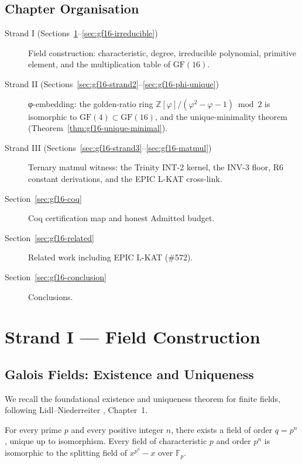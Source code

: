\subsection{Chapter Organisation}

\begin{description}
  \item[Strand I (Sections~\ref{sec:gf16-strand1}–\ref{sec:gf16-irreducible})]
    Field construction: characteristic, degree, irreducible polynomial,
    primitive element, and the multiplication table of \(\mathrm{GF}(16)\).
  \item[Strand II (Sections~\ref{sec:gf16-strand2}–\ref{sec:gf16-phi-unique})]
    φ-embedding: the golden-ratio ring
    \(\mathbb{Z}[\varphi]/(\varphi^{2}-\varphi-1)\bmod 2\)
    is isomorphic to \(\mathrm{GF}(4)\subset\mathrm{GF}(16)\),
    and the unique-minimality theorem (Theorem~\ref{thm:gf16-unique-minimal}).
  \item[Strand III (Sections~\ref{sec:gf16-strand3}–\ref{sec:gf16-matmul})]
    Ternary matmul witness: the Trinity INT-2 kernel, the INV-3 floor,
    R6 constant derivations, and the EPIC L-KAT cross-link.
  \item[Section~\ref{sec:gf16-coq}]
    Coq certification map and honest Admitted budget.
  \item[Section~\ref{sec:gf16-related}]
    Related work including EPIC L-KAT (\#572).
  \item[Section~\ref{sec:gf16-conclusion}]
    Conclusions.
\end{description}

\section{Strand I — Field Construction}
\label{sec:gf16-strand1}

\subsection{Galois Fields: Existence and Uniqueness}
\label{sec:gf16-exist}

We recall the foundational existence and uniqueness theorem for finite fields,
following Lidl–Niederreiter \cite{lidl_finite_fields}, Chapter~1.

\begin{theorem}
\label{thm:gf-exist-unique}
For every prime \(p\) and every positive integer \(n\), there exists
a field of order \(q = p^{n}\), unique up to isomorphism.
Every field of characteristic \(p\) and order \(p^n\) is isomorphic
to the splitting field of \(x^{p^n} - x\) over \(\mathbb{F}_{p}\).
\end{theorem}

